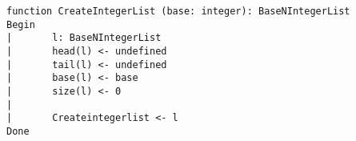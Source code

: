 \begin{lstlisting}[breaklines]
function CreateIntegerList (base: integer): BaseNIntegerList
Begin
|       l: BaseNIntegerList
|       head(l) <- undefined
|       tail(l) <- undefined
|       base(l) <- base
|       size(l) <- 0
|
|       Createintegerlist <- l
Done
\end{lstlisting}
